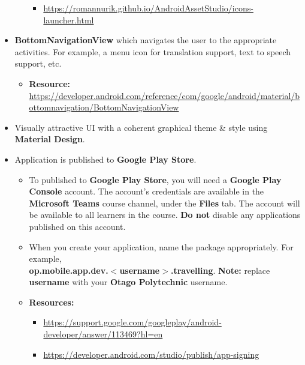 \documentclass{article}
\begin{document}
\begin{itemize}
\begin{itemize}
\begin{itemize}
			            \item \footnotesize\href{https://romannurik.github.io/AndroidAssetStudio/icons-launcher.html}{https://romannurik.github.io/AndroidAssetStudio/icons-launcher.html}
		            \end{itemize}
	      \end{itemize}
	\item \textbf{BottomNavigationView} which navigates the user to the appropriate activities. For example, a menu icon for translation support, text to speech support, etc.
	      \begin{itemize}
		      \item \textbf{Resource:} \footnotesize\href{https://developer.android.com/reference/com/google/android/material/bottomnavigation/BottomNavigationView}{https://developer.android.com/reference/com/google/android/material/bottomnavigation/BottomNavigationView}
	      \end{itemize}
	\item Visually attractive UI with a coherent graphical theme \& style using \textbf{Material Design}.
	\item Application is published to \textbf{Google Play Store}.
	      \begin{itemize}
		      \item To published to \textbf{Google Play Store}, you will need a \textbf{Google Play Console} account. The account's credentials are available in the \textbf{Microsoft Teams} course channel, under the \textbf{Files} tab. The account will be available to all learners in the course. \textbf{Do not} disable any applications published on this account.
		      \item When you create your application, name the package appropriately. For example, \\ \textbf{op.mobile.app.dev.$<$username$>$.travelling}. \textbf{Note:} replace \textbf{username} with your \textbf{Otago Polytechnic} username.
		      \item \textbf{Resources:}
		            \begin{itemize}
			            \item \footnotesize\href{https://support.google.com/googleplay/android-developer/answer/113469?hl=en}{https://support.google.com/googleplay/android-developer/answer/113469?hl=en}
			            \item \footnotesize\href{https://developer.android.com/studio/publish/app-signing}{https://developer.android.com/studio/publish/app-signing}
		            \end{itemize}

\end{itemize}
\end{itemize}
\end{document}

